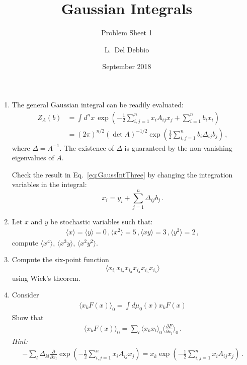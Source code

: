 \documentclass{tutorial}
\subtitle{Problem Sheet 1}
\title{Gaussian Integrals}
\author{L.~Del Debbio}
\date{September 2018}
\begin{document}
\maketitle

\begin{enumerate}

\item The general Gaussian integral can be readily evaluated:
  \begin{align}
    Z_A(b) &= \int d^nx\, \exp\left(
             -\frac12 \sum_{i,j=1}^n x_i A_{ij} x_j
             + \sum_{i=1}^n b_i x_i
             \right) \\
    \label{eq:GaussIntThree}
           &=  \left(2\pi\right)^{n/2} \left(\det A \right)^{-1/2}
             \exp\left(
             \frac12 \sum_{i,j=1}^n b_i \Delta_{ij} b_j
             \right) \, ,
  \end{align}
  where $\Delta = A^{-1}$. The existence of $\Delta$ is guaranteed by
  the non-vanishing eigenvalues of $A$.

  Check the result in Eq.~\ref{eq:GaussIntThree} by changing the
  integration variables in the integral:
  \[
    x_i = y_i + \sum_{j=1}^n \Delta_{ij} b_j\, .
  \]

\item Let $x$ and $y$ be stochastic variables such that:
  \begin{align*}
    \langle x \rangle = \langle y \rangle =0\, ,
    \langle x^2 \rangle = 5\, ,
    \langle x y \rangle = 3 \, ,
    \langle y^2 \rangle = 2\, ,
  \end{align*}
  compute $\langle x^4\rangle$, $\langle x^3 y \rangle$, $\langle x^2
  y^2\rangle$.  

\item Compute the six-point function
  \[
    \langle x_{i_1} x_{i_2} x_{i_3} x_{i_4} x_{i_5} x_{i_6} \rangle    
  \]
  using Wick's theorem. 

\item Consider 
  \begin{align}
    \langle x_k F(x) \rangle_0 = 
    \int d\mu_0(x) x_k F(x) 
  \end{align}
  Show that
  \begin{align}
    \langle x_k F(x) \rangle_0  = 
    \sum_l \langle x_k x_l \rangle_0 \langle \frac{\partial F}{\partial x_l}\rangle_0\, .
  \end{align}
  {\em Hint:} 
  \begin{align}
    - \sum_l \Delta_{kl} \frac{\partial}{\partial x_l}
    \exp\left(
    -\frac12 \sum_{i,j=1}^n x_i A_{ij} x_j
    \right) = 
    x_k \exp\left(
    -\frac12 \sum_{i,j=1}^n x_i A_{ij} x_j
    \right)\, .
  \end{align}


\end{enumerate}
\end{document}
